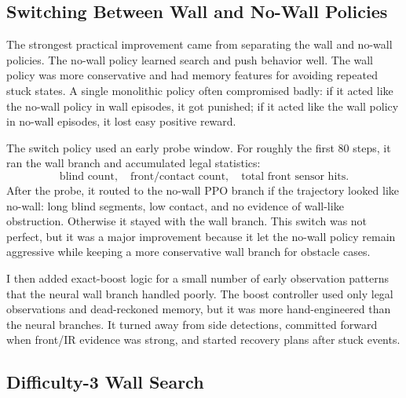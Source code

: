 \documentclass[11pt, oneside]{article}   	%
\begin{document}
\subsection{Switching Between Wall and No-Wall Policies}

The strongest practical improvement came from separating the wall and no-wall policies.
The no-wall policy learned search and push behavior well. The wall policy was more
conservative and had memory features for avoiding repeated stuck states. A single
monolithic policy often compromised badly: if it acted like the no-wall policy in wall
episodes, it got punished; if it acted like the wall policy in no-wall episodes, it lost
easy positive reward.

The switch policy used an early probe window. For roughly the first 80 steps, it ran the
wall branch and accumulated legal statistics:
\[
  \text{blind count},\quad
  \text{front/contact count},\quad
  \text{total front sensor hits}.
\]
After the probe, it routed to the no-wall PPO branch if the trajectory looked like
no-wall: long blind segments, low contact, and no evidence of wall-like obstruction.
Otherwise it stayed with the wall branch. This switch was not perfect, but it was a
major improvement because it let the no-wall policy remain aggressive while keeping a
more conservative wall branch for obstacle cases.

I then added exact-boost logic for a small number of early observation patterns that the
neural wall branch handled poorly. The boost controller used only legal observations and
dead-reckoned memory, but it was more hand-engineered than the neural branches. It
turned away from side detections, committed forward when front/IR evidence was strong,
and started recovery plans after stuck events.

\subsection{Difficulty-3 Wall Search}
\end{document}
